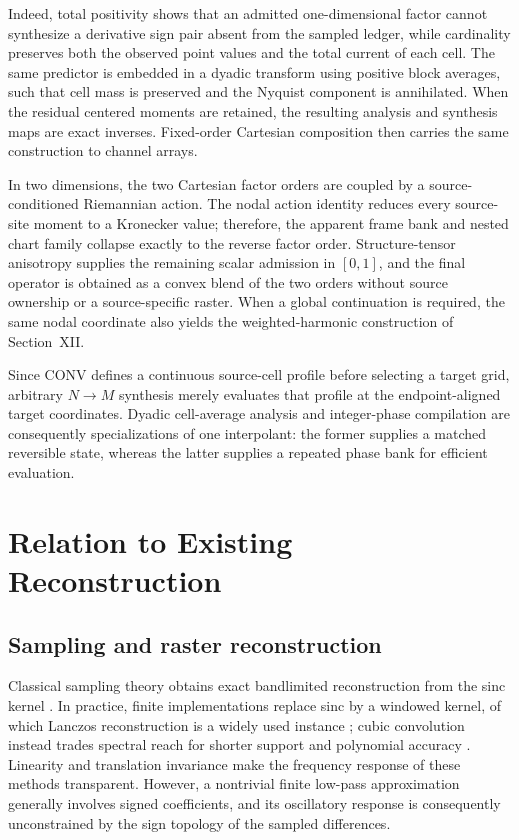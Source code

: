 \documentclass[journal]{IEEEtran}
\begin{document}
Indeed, total positivity shows that an admitted one-dimensional factor cannot
synthesize a derivative sign pair absent from the sampled ledger, while
cardinality preserves both the observed point values and the total current of
each cell. The same predictor is embedded in a dyadic transform using positive
block averages, such that cell mass is preserved and the Nyquist component is
annihilated. When the residual centered moments are retained, the resulting
analysis and synthesis maps are exact inverses. Fixed-order Cartesian
composition then carries the same construction to channel arrays.

In two dimensions, the two Cartesian factor orders are coupled by a
source-conditioned Riemannian action. The nodal action identity reduces every
source-site moment to a Kronecker value; therefore, the apparent frame bank
and nested chart family collapse exactly to the reverse factor order.
Structure-tensor anisotropy supplies the remaining scalar admission in
\([0,1]\), and the final operator is obtained as a convex blend of the two
orders without source ownership or a source-specific raster. When a global
continuation is required, the same nodal coordinate also yields the
weighted-harmonic construction of Section~XII.

Since CONV defines a continuous source-cell profile before selecting a target
grid, arbitrary \(N\to M\) synthesis merely evaluates that profile at the
endpoint-aligned target coordinates. Dyadic cell-average analysis and
integer-phase compilation are consequently specializations of one
interpolant: the former supplies a matched reversible state, whereas the
latter supplies a repeated phase bank for efficient evaluation.

\section{Relation to Existing Reconstruction}

\subsection{Sampling and raster reconstruction}

Classical sampling theory obtains exact bandlimited reconstruction from the
sinc kernel \cite{shannon1949}. In practice, finite implementations replace
sinc by a windowed kernel, of which Lanczos reconstruction is a widely used
instance \cite{lanczos1956}; cubic convolution instead trades spectral reach
for shorter support and polynomial accuracy \cite{keys1981}. Linearity and
translation invariance make the frequency response of these methods
transparent. However, a nontrivial finite low-pass approximation generally
involves signed coefficients, and its oscillatory response is consequently
unconstrained by the sign topology of the sampled differences.
\end{document}
